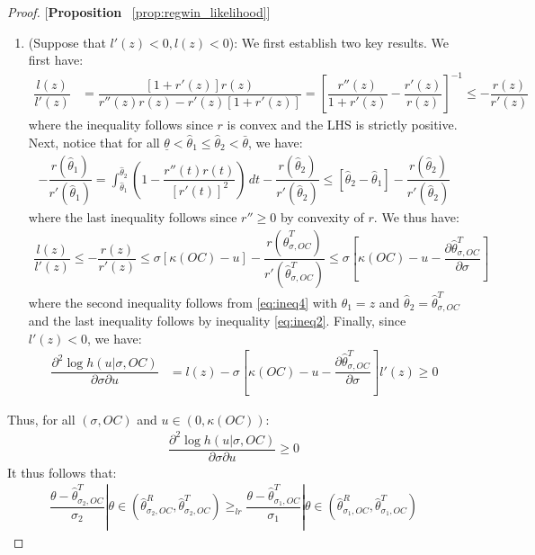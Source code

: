 \begin{proof}{[\textbf{Proposition} ~\ref{prop:regwin_likelihood}]}
\begin{enumerate}[label=(\arabic*),ref=\thelemma(\arabic*)]
  \item (Suppose that $l'(z)< 0, l(z) < 0$): We first establish two key results. We first have:
  \begin{align}\label{eq:ineq3}
  \dfrac{l(z)}{l'(z)} &= \dfrac{[1+r'(z)]r(z)}{r''(z)r(z) - r'(z)[1+r'(z)]} = \left[\dfrac{r''(z)}{1+r'(z)} - \dfrac{r'(z)}{r(z)}\right]^{-1} \leq -\dfrac{r(z)}{r'(z)}
  \end{align}
  where the inequality follows since $r$ is convex and the LHS is strictly positive. Next, notice that for all $\underline{\theta}<\hat{\theta}_1\leq \hat{\theta}_2<\bar{\theta}$, we have:
  \begin{align}\label{eq:ineq4}
      -\dfrac{r(\hat{\theta}_1)}{r'(\hat{\theta}_1)} = \int_{\hat{\theta}_1}^{\hat{\theta}_2}\left(1-\dfrac{r''(t)r(t)}{[r'(t)]^2}\right) \,dt - \dfrac{r(\hat{\theta}_2)}{r'(\hat{\theta}_2)} \leq [\hat{\theta}_2 - \hat{\theta}_1] - \dfrac{r(\hat{\theta}_2)}{r'(\hat{\theta}_2)} 
  \end{align}
  where the last inequality follows since $r''\geq 0$ by convexity of $r$. We thus have:
  \begin{align*}
      \dfrac{l(z)}{l'(z)} \leq  -\dfrac{r(z)}{r'(z)} \leq \sigma[\kappa(OC)-u] - \dfrac{r(\hat{\theta}^T_{\sigma,OC})}{r'(\hat{\theta}^T_{\sigma,OC})} \leq \sigma\left[\kappa(OC)-u-\dfrac{\partial \hat{\theta}^T_{\sigma,OC}}{\partial \sigma}\right] 
  \end{align*}
  where the second inequality follows from \eqref{eq:ineq4} with $\hat{\theta}_1=z$ and $\hat{\theta}_2 = \hat{\theta}^T_{\sigma,OC}$ and the last inequality follows by inequality \eqref{eq:ineq2}. Finally, since $l'(z)<0$, we have:
  \begin{align*}
  \dfrac{\partial^2 \log h(u|\sigma,OC)}{\partial \sigma \partial u} &= l(z) - \sigma\left[\kappa(OC)-u-\dfrac{\partial \hat{\theta}^T_{\sigma,OC}}{\partial \sigma}\right]l'(z) \geq 0
  \end{align*}
\end{enumerate}
Thus, for all $(\sigma,OC)$ and $u\in(0,\kappa(OC))$:
\begin{align}\label{eq:ineq5}
    \dfrac{\partial^2 \log h(u|\sigma,OC)}{\partial \sigma \partial u} \geq 0
\end{align}
It thus follows that:
\begin{align*}
  \dfrac{\theta - \hat{\theta}^T_{\sigma_2,OC}}{\sigma_2}|\theta\in (\hat{\theta}^R_{\sigma_2,OC}, \hat{\theta}^T_{\sigma_2,OC}) \geq_{lr} \dfrac{\theta - \hat{\theta}^T_{\sigma_1,OC}}{\sigma_1}|\theta\in (\hat{\theta}^R_{\sigma_1,OC}, \hat{\theta}^T_{\sigma_1,OC})

\end{align*}
\end{proof}
